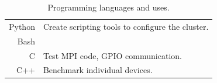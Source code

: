 \begin{table}[tbh]
\caption{Programming languages and uses. \label{languages}}
\begin{center}
\begin{tabular}{|r|l|}
  \hline
  Python & Create scripting tools to configure the cluster. \\
  Bash &  \\ \cline{1-2}
  C & Test MPI code, GPIO communication. \\ \cline{1-2}
  C++ & Benchmark individual devices. \\
  \hline
\end{tabular}
\end{center}
\end{table}

